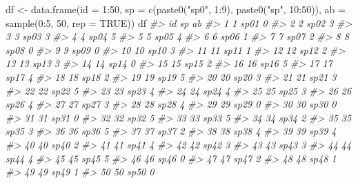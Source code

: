 \documentclass[
]{book}
\newenvironment{Shaded}{\begin{snugshade}}{\end{snugshade}}
\newcommand{\AttributeTok}[1]{\textcolor[rgb]{0.77,0.63,0.00}{#1}}
\newcommand{\CommentTok}[1]{\textcolor[rgb]{0.56,0.35,0.01}{\textit{#1}}}
\newcommand{\ConstantTok}[1]{\textcolor[rgb]{0.00,0.00,0.00}{#1}}
\newcommand{\DecValTok}[1]{\textcolor[rgb]{0.00,0.00,0.81}{#1}}
\newcommand{\FunctionTok}[1]{\textcolor[rgb]{0.00,0.00,0.00}{#1}}
\newcommand{\NormalTok}[1]{#1}
\newcommand{\OtherTok}[1]{\textcolor[rgb]{0.56,0.35,0.01}{#1}}
\newcommand{\SpecialCharTok}[1]{\textcolor[rgb]{0.00,0.00,0.00}{#1}}
\newcommand{\StringTok}[1]{\textcolor[rgb]{0.31,0.60,0.02}{#1}}
\begin{document}
\begin{Shaded}
\begin{Highlighting}[]
\NormalTok{df }\OtherTok{\textless{}{-}} \FunctionTok{data.frame}\NormalTok{(}\AttributeTok{id =} \DecValTok{1}\SpecialCharTok{:}\DecValTok{50}\NormalTok{,}
                  \AttributeTok{sp =} \FunctionTok{c}\NormalTok{(}\FunctionTok{paste0}\NormalTok{(}\StringTok{"sp0"}\NormalTok{, }\DecValTok{1}\SpecialCharTok{:}\DecValTok{9}\NormalTok{), }\FunctionTok{paste0}\NormalTok{(}\StringTok{"sp"}\NormalTok{, }\DecValTok{10}\SpecialCharTok{:}\DecValTok{50}\NormalTok{)),}
                  \AttributeTok{ab =} \FunctionTok{sample}\NormalTok{(}\DecValTok{0}\SpecialCharTok{:}\DecValTok{5}\NormalTok{, }\DecValTok{50}\NormalTok{, }\AttributeTok{rep =} \ConstantTok{TRUE}\NormalTok{))}
\NormalTok{df}
\CommentTok{\#\textgreater{}    id   sp ab}
\CommentTok{\#\textgreater{} 1   1 sp01  0}
\CommentTok{\#\textgreater{} 2   2 sp02  3}
\CommentTok{\#\textgreater{} 3   3 sp03  3}
\CommentTok{\#\textgreater{} 4   4 sp04  5}
\CommentTok{\#\textgreater{} 5   5 sp05  4}
\CommentTok{\#\textgreater{} 6   6 sp06  1}
\CommentTok{\#\textgreater{} 7   7 sp07  2}
\CommentTok{\#\textgreater{} 8   8 sp08  0}
\CommentTok{\#\textgreater{} 9   9 sp09  0}
\CommentTok{\#\textgreater{} 10 10 sp10  3}
\CommentTok{\#\textgreater{} 11 11 sp11  1}
\CommentTok{\#\textgreater{} 12 12 sp12  2}
\CommentTok{\#\textgreater{} 13 13 sp13  3}
\CommentTok{\#\textgreater{} 14 14 sp14  0}
\CommentTok{\#\textgreater{} 15 15 sp15  2}
\CommentTok{\#\textgreater{} 16 16 sp16  5}
\CommentTok{\#\textgreater{} 17 17 sp17  4}
\CommentTok{\#\textgreater{} 18 18 sp18  2}
\CommentTok{\#\textgreater{} 19 19 sp19  5}
\CommentTok{\#\textgreater{} 20 20 sp20  3}
\CommentTok{\#\textgreater{} 21 21 sp21  3}
\CommentTok{\#\textgreater{} 22 22 sp22  5}
\CommentTok{\#\textgreater{} 23 23 sp23  4}
\CommentTok{\#\textgreater{} 24 24 sp24  4}
\CommentTok{\#\textgreater{} 25 25 sp25  3}
\CommentTok{\#\textgreater{} 26 26 sp26  4}
\CommentTok{\#\textgreater{} 27 27 sp27  3}
\CommentTok{\#\textgreater{} 28 28 sp28  4}
\CommentTok{\#\textgreater{} 29 29 sp29  0}
\CommentTok{\#\textgreater{} 30 30 sp30  0}
\CommentTok{\#\textgreater{} 31 31 sp31  0}
\CommentTok{\#\textgreater{} 32 32 sp32  5}
\CommentTok{\#\textgreater{} 33 33 sp33  5}
\CommentTok{\#\textgreater{} 34 34 sp34  2}
\CommentTok{\#\textgreater{} 35 35 sp35  3}
\CommentTok{\#\textgreater{} 36 36 sp36  5}
\CommentTok{\#\textgreater{} 37 37 sp37  2}
\CommentTok{\#\textgreater{} 38 38 sp38  4}
\CommentTok{\#\textgreater{} 39 39 sp39  4}
\CommentTok{\#\textgreater{} 40 40 sp40  2}
\CommentTok{\#\textgreater{} 41 41 sp41  4}
\CommentTok{\#\textgreater{} 42 42 sp42  3}
\CommentTok{\#\textgreater{} 43 43 sp43  3}
\CommentTok{\#\textgreater{} 44 44 sp44  4}
\CommentTok{\#\textgreater{} 45 45 sp45  5}
\CommentTok{\#\textgreater{} 46 46 sp46  0}
\CommentTok{\#\textgreater{} 47 47 sp47  2}
\CommentTok{\#\textgreater{} 48 48 sp48  1}
\CommentTok{\#\textgreater{} 49 49 sp49  1}
\CommentTok{\#\textgreater{} 50 50 sp50  0}
\end{Highlighting}
\end{Shaded}
\end{document}
